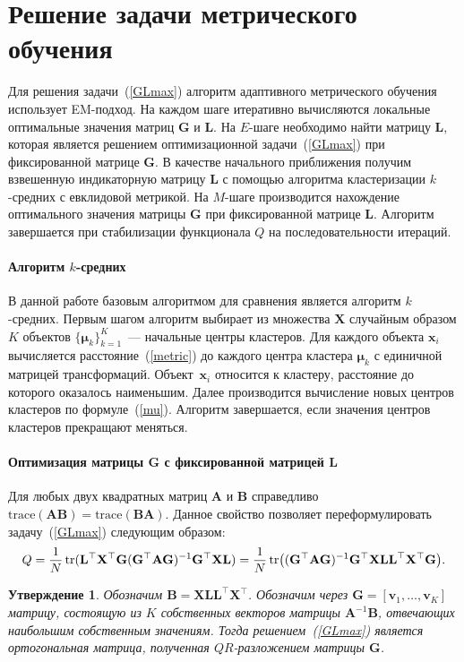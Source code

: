 \documentclass[12pt,twoside]{article}
\newcommand{\x}{\mathbf{x}}
\newtheorem{Th}{Утверждение}
\begin{document}
\section{Решение задачи метрического обучения}
Для решения задачи~(\ref{GLmax}) алгоритм адаптивного метрического обучения использует \mbox{EM-под}\-ход.
На каждом шаге итеративно вычисляются локальные оптимальные значения матриц $\mathbf{G}$ и $\mathbf{L}$.
На $E$-шаге необходимо найти матрицу $\mathbf{L}$, которая является решением оптимизационной задачи~(\ref{GLmax}) при фиксированной матрице $\mathbf{G}$.
В качестве начального приближения получим взвешенную индикаторную матрицу $\mathbf{L}$ с помощью алгоритма кластеризации $k$-средних с евклидовой метрикой.
На $M$-шаге производится нахождение оптимального значения матрицы $\mathbf{G}$ при фиксированной матрице $\mathbf{L}$.
Алгоритм завершается при стабилизации функционала $Q$ на последовательности итераций.

\paragraph{Алгоритм $k$-средних}
В данной работе базовым алгоритмом для сравнения является алгоритм $k$-средних.
Первым шагом алгоритм выбирает из множества $\mathbf{X}$ случайным образом $K$ объектов $\{\boldsymbol{\mu}_k\}_{k=1}^K$~--- начальные центры кластеров.
Для каждого объекта $\x_i$ вычисляется расстояние~(\ref{metric}) до каждого центра кластера $\boldsymbol{\mu}_k$ с единичной матрицей трансформаций.
Объект~$\x_i$ относится к кластеру, расстояние до которого оказалось наименьшим.
Далее производится вычисление новых центров кластеров по формуле~(\ref{mu}).
Алгоритм завершается, если значения центров кластеров прекращают меняться.

\paragraph{Оптимизация матрицы G с фиксированной матрицей L}
Для любых двух квадратных матриц $\mathbf{A}$ и $\mathbf{B}$ справедливо $\text{trace}(\mathbf{AB}) = \text{trace}(\mathbf{BA})$.
Данное свойство позволяет переформулировать задачу~(\ref{GLmax}) следующим образом:
\[
    Q = \frac 1N \Tr (\mathbf{L}^{\top} \mathbf{X}^{\top} \mathbf{G} (\mathbf{G}^{\top} \mathbf{A G})^{-1} \mathbf{G}^{\top} \mathbf{X L}) = \frac 1N \Tr \bigl((\mathbf{G}^{\top} \mathbf{A G})^{-1} \mathbf{G}^{\top} \mathbf{X L L}^{\top} \mathbf{X}^{\top} \mathbf{G}\bigr).
\]
\begin{Th}
     Обозначим $\mathbf{B} = \mathbf{X L L}^{\top} \mathbf{X}^{\top}$.
     Обозначим через $\mathbf{G} = [\mathbf{v}_1, \ldots, \mathbf{v}_K]$ матрицу, состоящую из $K$ собственных векторов матрицы $\mathbf{A}^{-1}\mathbf{B}$, отвечающих наибольшим собственным значениям.
     Тогда решением~(\ref{GLmax}) является ортогональная матрица, полученная $QR$-раз\-ло\-же\-ни\-ем матрицы $\mathbf{G}$.
\end{Th}
\end{document}
